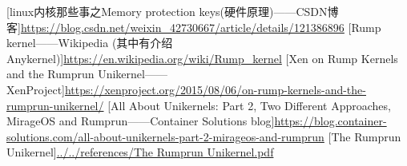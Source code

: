 \documentclass[UTF8,fontset=none,linespread=1.15]{ctexart}
\begin{document}
\begin{thebibliography}{99}
 [linux内核那些事之Memory protection keys(硬件原理)——CSDN博客]\url{https://blog.csdn.net/weixin_42730667/article/details/121386896}
 [Rump kernel——Wikipedia (其中有介绍 Anykernel)]\url{https://en.wikipedia.org/wiki/Rump_kernel}
 [Xen on Rump Kernels and the Rumprun Unikernel——XenProject]\url{https://xenproject.org/2015/08/06/on-rump-kernels-and-the-rumprun-unikernel/}
 [All About Unikernels: Part 2, Two Different Approaches, MirageOS and Rumprun——Container Solutions blog]\url{https://blog.container-solutions.com/all-about-unikernels-part-2-mirageos-and-rumprun}
 [The Rumprun Unikernel]\url{../../references/The Rumprun Unikernel.pdf}
\end{thebibliography}
\end{document}
